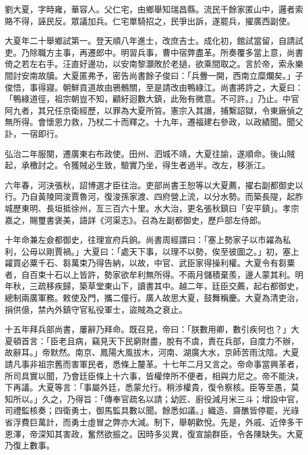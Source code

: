 \begin{pinyinscope}
劉大夏，字時雍，華容人。父仁宅，由鄉舉知瑞昌縣。流民千餘家匿山中，邏者索賂不得，誣民反。眾議加兵。仁宅單騎招之，民爭出訴，遂罷兵，擢廣西副使。

大夏年二十舉鄉試第一。登天順八年進士，改庶吉士。成化初，館試當留，自請試吏。乃除職方主事，再遷郎中。明習兵事，曹中宿弊盡革。所奏覆多當上意，尚書倚之若左右手。汪直好邊功，以安南黎灝敗於老撾，欲乘間取之。言於帝，索永樂間討安南故牘。大夏匿弗予，密告尚書餘子俊曰：「兵釁一開，西南立糜爛矣。」子俊悟，事得寢。朝鮮貢道故由鴉鶻關，至是請改由鴨綠江。尚書將許之，大夏曰：「鴨綠道徑，祖宗朝豈不知，顧紆迴數大鎮，此殆有微意。不可許。」乃止。中官阿九者，其兄任京衛經歷，以罪為大夏所笞。憲宗入其譖，捕繫詔獄，令東廠偵之無所得。會懷恩力救，乃杖二十而釋之。十九年，遷福建右參政，以政績聞。聞父訃，一宿即行。

弘治二年服闋，遷廣東右布政使。田州、泗城不靖，大夏往諭，遂順命。後山賊起，承檄討之。令獲賊必生致，驗實乃坐，得生者過半。改左，移浙江。

六年春，河決張秋，詔博選才臣往治。吏部尚書王恕等以大夏薦，擢右副都御史以行。乃自黃陵岡浚賈魯河，復浚孫家渡、四府營上流，以分水勢。而築長隄，起胙城歷東明、長垣抵徐州，亙三百六十里。水大治，更名張秋鎮曰「安平鎮」。孝宗嘉之，賜璽書褒美，語詳《河渠志》。召為左副都御史，歷戶部左侍郎。

十年命兼左僉都御史，往理宣府兵餉。尚書周經謂曰：「塞上勢家子以市糴為私利，公毋以剛賈禍。」大夏曰：「處天下事，以理不以勢，俟至彼圖之。」初，塞上糴買必粟千石、芻萬束乃得告納，以故，中官、武臣家得操利權。大夏令有芻粟者，自百束十石以上皆許，勢家欲牟利無所得。不兩月儲積棄羨，邊人蒙其利。明年秋，三疏移疾歸，築草堂東山下，讀書其中。越二年，廷臣交薦，起右都御史，總制兩廣軍務。敕使及門，攜二僮行。廣人故思大夏，鼓舞稱慶。大夏為清吏治，捐供億，禁內外鎮守官私役軍士，盜賊為之衰止。

十五年拜兵部尚書，屢辭乃拜命。既召見，帝曰：「朕數用卿，數引疾何也？」大夏頓首言：「臣老且病，竊見天下民窮財盡，脫有不虞，責在兵部，自度力不辦，故辭耳。」帝默然。南京、鳳陽大風拔木，河南、湖廣大水，京師苦雨沈陰。大夏請凡事非祖宗舊而害軍民者，悉條上釐革。十七年二月又言之。帝命事當興革者，所司具實以聞，乃會廷臣條上十六事，皆權倖所不便者，相與力尼之。帝不能決，下再議。大夏等言：「事屬外廷，悉蒙允行。稍涉權貴，復令察核。臣等至愚，莫知所以。」久之，乃得旨：「傳奉官疏名以請；幼匠、廚役減月米三斗；增設中官，司禮監核奏；四衛勇士，御馬監具數以聞。餘悉如議。」織造、齋醮皆停罷，光祿省浮費巨萬計，而勇士虛冒之弊亦大減。制下，舉朝歡悅。先是，外戚、近倖多干恩澤，帝深知其害政，奮然欲振之。因時多災異，復宣諭群臣，令各陳缺失。大夏乃復上數事。


\end{pinyinscope}

